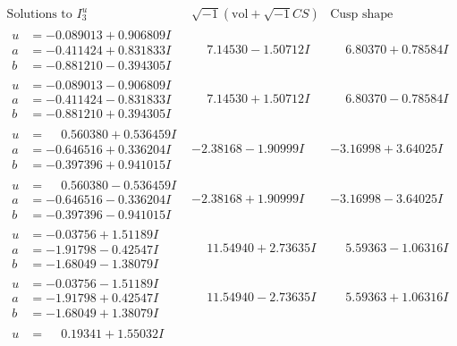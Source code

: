 \documentclass[1p]{elsarticle_modified}
\theoremstyle{definition}
\newcommand{\I}{\sqrt{-1}}
\begin{document}
$$\begin{array}{c|c|c}  
\text{Solutions to }I^u_{3}& \I (\text{vol} + \sqrt{-1}CS) & \text{Cusp shape}\\
 \hline 
\begin{aligned}
u &= -0.089013 + 0.906809 I \\
a &= -0.411424 + 0.831833 I \\
b &= -0.881210 - 0.394305 I\end{aligned}
 & \phantom{-}7.14530 - 1.50712 I & \phantom{-}6.80370 + 0.78584 I \\ \hline\begin{aligned}
u &= -0.089013 - 0.906809 I \\
a &= -0.411424 - 0.831833 I \\
b &= -0.881210 + 0.394305 I\end{aligned}
 & \phantom{-}7.14530 + 1.50712 I & \phantom{-}6.80370 - 0.78584 I \\ \hline\begin{aligned}
u &= \phantom{-}0.560380 + 0.536459 I \\
a &= -0.646516 + 0.336204 I \\
b &= -0.397396 + 0.941015 I\end{aligned}
 & -2.38168 - 1.90999 I & -3.16998 + 3.64025 I \\ \hline\begin{aligned}
u &= \phantom{-}0.560380 - 0.536459 I \\
a &= -0.646516 - 0.336204 I \\
b &= -0.397396 - 0.941015 I\end{aligned}
 & -2.38168 + 1.90999 I & -3.16998 - 3.64025 I \\ \hline\begin{aligned}
u &= -0.03756 + 1.51189 I \\
a &= -1.91798 - 0.42547 I \\
b &= -1.68049 - 1.38079 I\end{aligned}
 & \phantom{-}11.54940 + 2.73635 I & \phantom{-}5.59363 - 1.06316 I \\ \hline\begin{aligned}
u &= -0.03756 - 1.51189 I \\
a &= -1.91798 + 0.42547 I \\
b &= -1.68049 + 1.38079 I\end{aligned}
 & \phantom{-}11.54940 - 2.73635 I & \phantom{-}5.59363 + 1.06316 I \\ \hline\begin{aligned}
u &= \phantom{-}0.19341 + 1.55032 I \\

\end{aligned}
\end{array}$$
\end{document}
